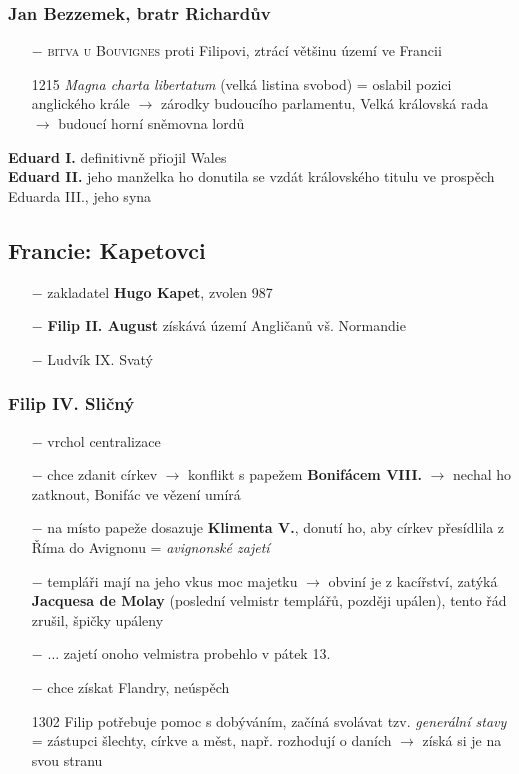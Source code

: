 \documentclass{article}
\begin{document}
\subsubsection*{Jan Bezzemek, bratr Richardův}
\begin{itemize}
    \vspace{-0.5em}
    \setlength\itemsep{0.15em}
    \item[$-$] \textsc{bitva u Bouvignes} proti Filipovi, ztrácí většinu území ve Francii
    \item[1215] \textit{Magna charta libertatum} (velká listina svobod) = oslabil pozici anglického krále $\rightarrow$ zárodky budoucího parlamentu, Velká královská rada $\rightarrow$ budoucí horní sněmovna lordů
\end{itemize}
\textbf{Eduard I.} definitivně přiojil Wales\\
\textbf{Eduard II.} jeho manželka ho donutila se vzdát královského titulu ve prospěch Eduarda III., jeho syna


\subsection*{Francie: Kapetovci}
\begin{itemize}
    \vspace{-0.5em}
    \setlength\itemsep{0.15em}
    \item[$-$] zakladatel \textbf{Hugo Kapet}, zvolen 987
    \item[$-$] \textbf{Filip II. August} získává území Angličanů vš. Normandie
    \item[$-$] Ludvík IX. Svatý
\end{itemize}
\subsubsection*{Filip IV. Sličný}
\begin{itemize}
    \vspace{-0.5em}
    \setlength\itemsep{0.15em}
    \item[$-$] vrchol centralizace
    \item[$-$] chce zdanit církev $\rightarrow$ konflikt s papežem \textbf{Bonifácem VIII.} $\rightarrow$ nechal ho zatknout, Bonifác ve vězení umírá
    \item[$-$] na místo papeže dosazuje \textbf{Klimenta V.}, donutí ho, aby církev přesídlila z Říma do Avignonu = \textit{avignonské zajetí}
    \item[$-$] templáři mají na jeho vkus moc majetku $\rightarrow$ obviní je z kacířství, zatýká \textbf{Jacquesa de Molay} (poslední velmistr templářů, později upálen), tento řád zrušil, špičky upáleny
    \item[$-$]  $\dots$ zajetí onoho velmistra probehlo v pátek 13.
    \item[$-$] chce získat Flandry, neúspěch
    \item[1302] Filip potřebuje pomoc s dobýváním, začíná svolávat tzv. \textit{generální stavy} = zástupci šlechty, církve a měst, např. rozhodují o daních $\rightarrow$ získá si je na svou stranu
\end{itemize}
\end{document}
